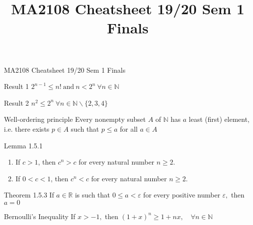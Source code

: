 \documentclass[10pt,landscape]{article}
\title{MA2108 Cheatsheet 19/20 Sem 1 Finals}
\makeatletter
\renewcommand{\section}{\@startsection{section}{1}{0mm}%
                                {-1ex plus -.5ex minus -.2ex}%
                                {0.5ex plus .2ex}%
                                {\normalfont\large\bfseries}}
\theoremstyle{definition}
\newcommand{\thistheoremname}{}
\newtheorem*{genericthm*}{\thistheoremname}
\newenvironment{namedthm*}[1]
{\renewcommand{\thistheoremname}{#1}\begin{genericthm*}}
{\end{genericthm*}}
\makeatother
\begin{document}
\begin{center}
	{\large MA2108 Cheatsheet 19/20 Sem 1 Finals}
\end{center}

\raggedright
\footnotesize

\begin{multicols}{3}

	\setlength{\premulticols}{1pt}
	\setlength{\postmulticols}{1pt}
	\setlength{\multicolsep}{1pt}
	\setlength{\columnsep}{2pt}


	\begin{namedthm*}{Result 1}
		\(2^{n-1} \leq n!~ \text{and} ~ n < 2^{n}~\forall n \in \mathbb{N}\)
	\end{namedthm*}

	\begin{namedthm*}{Result 2}
		\(n^{2} \leq 2^{n}~\forall n \in \mathbb{N} \backslash \{2,3,4\}\)
	\end{namedthm*}

	\begin{namedthm*}{Well-ordering principle}
		Every nonempty subset \(A\) of \(\mathbb{N}\) has \(a\) least (first) element,
		i.e. there exists \(p \in A\) such that \(p \leq a\) for all \(a \in A\)
	\end{namedthm*}

	\begin{namedthm*}{Lemma 1.5.1}
		~
		\begin{enumerate}
			\item If \(c > 1\), then \(c^{n} > c\) for every natural number \(n \geq 2\).
			\item If \(0 < c < 1\), then \(c^{n} < c\) for every natural number \(n \geq 2\).
		\end{enumerate}
	\end{namedthm*}

	\begin{namedthm*}{Theorem 1.5.3}
		If \(a \in \mathbb{R}\) is such that \(0 \leq a< \varepsilon\) for every positive number \(\varepsilon,\) then \(a=0\)
	\end{namedthm*}

	\begin{namedthm*}{Bernoulli's Inequality}
		If \(x>-1,\) then
		$
			(1+x)^{n} \geq 1+n x, \quad \forall n \in \mathbb{N}
		$
	\end{namedthm*}


\end{multicols}
\end{document}
